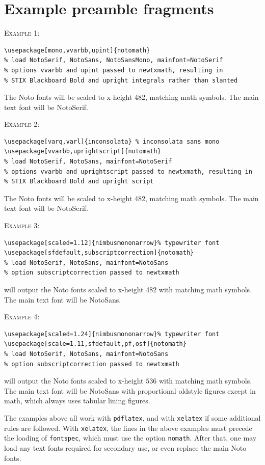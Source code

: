 \documentclass[]{article}
\begin{document}
 
\section*{Example preamble fragments}
\textsc{Example 1:}
\begin{verbatim}
\usepackage[mono,vvarbb,upint]{notomath} 
% load NotoSerif, NotoSans, NotoSansMono, mainfont=NotoSerif
% options vvarbb and upint passed to newtxmath, resulting in
% STIX Blackboard Bold and upright integrals rather than slanted
\end{verbatim}
The Noto fonts will be scaled to x-height 482, matching math symbols. The main text font will be NotoSerif.

\textsc{Example 2:}
\begin{verbatim}
\usepackage[varq,varl]{inconsolata} % inconsolata sans mono
\usepackage[vvarbb,uprightscript]{notomath} 
% load NotoSerif, NotoSans, mainfont=NotoSerif
% options vvarbb and uprightscript passed to newtxmath, resulting in
% STIX Blackboard Bold and upright script
\end{verbatim}
The Noto fonts will be scaled to x-height 482, matching math symbols. The main text font will be NotoSerif.

\textsc{Example 3:}
\begin{verbatim}
\usepackage[scaled=1.12]{nimbusmononarrow}% typewriter font
\usepackage[sfdefault,subscriptcorrection]{notomath}
% load NotoSerif, NotoSans, mainfont=NotoSans
% option subscriptcorrection passed to newtxmath
\end{verbatim}
will output the Noto fonts scaled to x-height 482 with matching math symbols. The main text font will be NotoSans.

\textsc{Example 4:}
\begin{verbatim}
\usepackage[scaled=1.24]{nimbusmononarrow}% typewriter font
\usepackage[scale=1.11,sfdefault,pf,osf]{notomath}
% load NotoSerif, NotoSans, mainfont=NotoSans
% option subscriptcorrection passed to newtxmath
\end{verbatim}
will output the Noto fonts scaled to x-height $536$ with matching math symbols. The main text font will be NotoSans with proportional oldstyle figures except in math, which always uses tabular lining figures.

The examples above all work with {\tt pdflatex}, and with {\tt xelatex} if some additional rules are followed. With {\tt xelatex}, the lines in the above examples must precede  the loading of {\tt fontspec}, which must use the option {\tt nomath}. After that, one may load any text fonts required for secondary use, or even replace the main Noto fonts.
\end{document}

